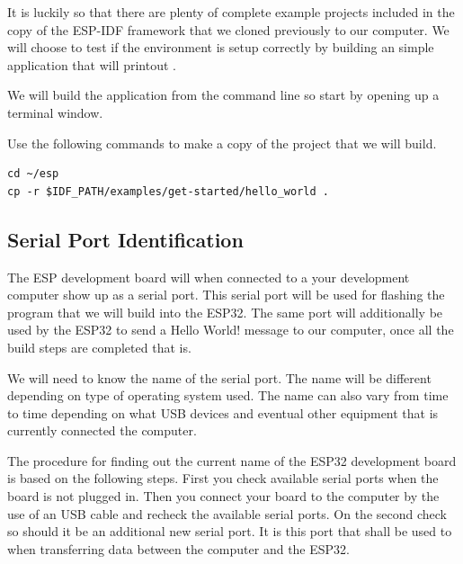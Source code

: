 \documentclass{tufte-book}
\begin{document}
It is luckily so that there are plenty of complete example projects included in the copy of the ESP-IDF framework that we cloned previously to our computer. We will choose to test if the environment is setup correctly by building an simple application that will printout .

We will build the application from the command line so start by opening up a terminal window.


Use the following commands to make a copy of the project that we will build.

\begin{lstlisting}
cd ~/esp
cp -r $IDF_PATH/examples/get-started/hello_world .
\end{lstlisting}

\subsection{Serial Port Identification}


The ESP development board will when connected to a your development computer show up as a serial port. This serial port will be used for flashing the program that we will build into the ESP32. The same port will additionally be used by the ESP32 to send a Hello World! message to our computer, once all the build steps are completed that is.

We will need to know the name of the serial port. The name will be different depending on type of operating system used. The name can also vary from time to time depending on what USB devices and eventual other equipment that is currently connected the computer.

The procedure for finding out the current name of the ESP32 development board is based on the following steps. First you check available serial ports when the board is not plugged in. Then you connect your board to the computer by the use of an USB cable and recheck the available serial ports. On the second check so should it be an additional new serial port. It is this port that shall be used to when transferring data between the computer and the ESP32. 
\end{document}
